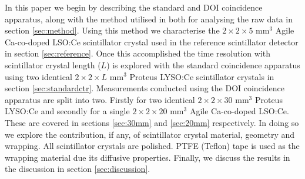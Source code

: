 In this paper we begin by describing the standard and DOI coincidence apparatus, along with the method utilised in both for analysing the raw data in section \ref{sec:method}. Using this method we characterise the $2\times2\times5$ mm$^3$ Agile Ca-co-doped LSO:Ce scintillator crystal used in the reference scintillator detector in section \ref{sec:reference}. Once this accomplished the time resolution with scintillator crystal length ($L$) is explored with the standard coincidence apparatus using two identical $2\times2\times L$ mm$^3$ Proteus LYSO:Ce scintillator crystals in section \ref{sec:standardctr}. Measurements conducted using the DOI coincidence apparatus are split into two. Firstly for two identical $2\times2\times30$ mm$^3$ Proteus LYSO:Ce and secondly for a single $2\times2\times20$ mm$^3$ Agile Ca-co-doped LSO:Ce. These are covered in sections \ref{sec:30mm} and \ref{sec:20mm} respectively. In doing so we explore the contribution, if any, of scintillator crystal material, geometry and wrapping. All scintillator crystals are polished. PTFE (Teflon) tape is used as the wrapping material due its diffusive properties. Finally, we discuss the results in the discussion in section \ref{sec:discussion}.
